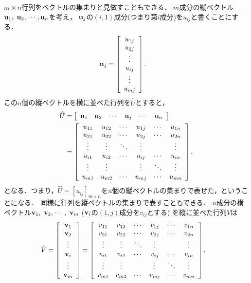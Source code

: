 $m\times n$行列をベクトルの集まりと見做すこともできる．
%
$m$成分の縦ベクトル${\bf u}_{1},~{\bf u}_{2},\cdots,{\bf u}_{n}$を考え，
${\bf u}_{j}$の$(i,1)$成分(つまり第$i$成分)を$u_{ij}$と書くことにする．
\begin{align}
{\bf u}_{j} & =\left[\begin{array}{c}
u_{1j}\\
u_{2j}\\
\vdots\\
u_{ij}\\
\vdots\\
u_{mj}
\end{array}\right].  
\end{align}
この$n$個の縦ベクトルを横に並べた行列を$\hat{U}$とすると，
\begin{align}
\hat{U} & =\left[\begin{array}{cccccc}
{\bf u}_{1} & {\bf u}_{2} & \cdots & {\bf u}_{j} & \cdots & {\bf u}_{n}\end{array}\right]\notag\\
 & =\left[\begin{array}{cccccc}
u_{11} & u_{12} & \cdots & u_{1j} & \cdots & u_{1n}\\
u_{21} & u_{22} & \cdots & u_{2j} & \cdots & u_{2n}\\
\vdots & \vdots & \ddots & \vdots &  & \vdots\\
u_{i1} & u_{i2} & \cdots & u_{ij} & \cdots & u_{in}\\
\vdots & \vdots &  & \vdots & \ddots & \vdots\\
u_{m1} & u_{m2} & \cdots & u_{mj} & \cdots & u_{mn}
\end{array}\right],
\end{align}
となる．つまり，$\hat{U}=\left[u_{ij}\right]_{m\times n}$を$n$個の縦ベクトルの集まりで表せた，ということになる．
同様に行列を縦ベクトルの集まりで表すこともできる．
$n$成分の横ベクトル${\bf v}_{1},~{\bf v}_{2},\cdots,~{\bf v}_{m}$ (${\bf v}_{i}$の$(1,j)$成分を$v_{ij}$とする)
を縦に並べた行列$\hat{V}$は
\begin{align}
\hat{V} & =\left[\begin{array}{c}
{\bf v}_{1}\\
{\bf v}_{2}\\
\vdots\\
{\bf v}_{i}\\
\vdots\\
{\bf v}_{m}
\end{array}\right]=\left[\begin{array}{cccccc}
v_{11} & v_{12} & \cdots & v_{1j} & \cdots & v_{1n}\\
v_{21} & v_{22} & \cdots & v_{2j} & \cdots & v_{2n}\\
\vdots & \vdots & \ddots & \vdots &  & \vdots\\
v_{i1} & v_{i2} & \cdots & v_{ij} & \cdots & v_{in}\\
\vdots & \vdots &  & \vdots & \ddots & \vdots\\
v_{m1} & v_{m2} & \cdots & v_{mj} & \cdots & v_{mn}
\end{array}\right], 
\end{align}
